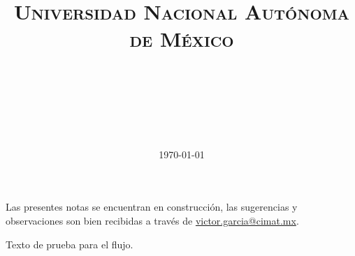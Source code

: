 \documentclass[paper=a4, fontsize=11pt]{scrartcl}
\title{
\normalfont\normalsize
\textsc{Universidad Nacional Autónoma de México} \\[25pt]
\horrule{0.5pt} \\[0.4cm]
\huge \titulo\\[25pt]
\horrule{2pt} \\[0.5cm]
}
\author{\autor}
\date{\normalsize\today}
\numberwithin{equation}{subsection}
\numberwithin{figure}{subsection}
\numberwithin{table}{subsection}
\theoremstyle{definition}
\begin{document}


Las presentes notas se encuentran en construcción, las sugerencias y observaciones son bien recibidas a través de \href{mailto:victor.garcia@cimat.mx}{victor.garcia@cimat.mx}.

Texto de prueba para el flujo.











%



\end{document}
